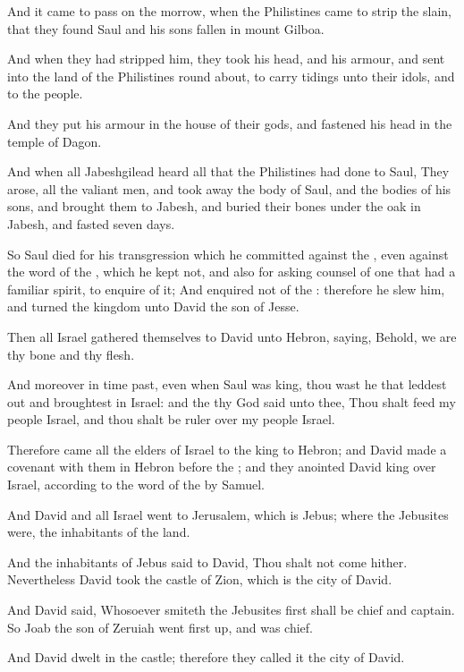 \Verse And it came to pass on the morrow, when the Philistines came to strip the slain, that they found Saul and his sons fallen in mount Gilboa.

\Verse And when they had stripped him, they took his head, and his armour, and sent into the land of the Philistines round about, to carry tidings unto their idols, and to the people.

\Verse And they put his armour in the house of their gods, and fastened his head in the temple of Dagon.

\Verse And when all Jabeshgilead heard all that the Philistines had done to Saul, \Verse They arose, all the valiant men, and took away the body of Saul, and the bodies of his sons, and brought them to Jabesh, and buried their bones under the oak in Jabesh, and fasted seven days.

\Verse So Saul died for his transgression which he committed against the \LORD, even against the word of the \LORD, which he kept not, and also for asking counsel of one that had a familiar spirit, to enquire of it; \Verse And enquired not of the \LORD: therefore he slew him, and turned the kingdom unto David the son of Jesse.


\Chapter
\Verse Then all Israel gathered themselves to David unto Hebron, saying, Behold, we are thy bone and thy flesh.

\Verse And moreover in time past, even when Saul was king, thou wast he that leddest out and broughtest in Israel: and the \LORD thy God said unto thee, Thou shalt feed my people Israel, and thou shalt be ruler over my people Israel.

\Verse Therefore came all the elders of Israel to the king to Hebron; and David made a covenant with them in Hebron before the \LORD; and they anointed David king over Israel, according to the word of the \LORD by Samuel.

\Verse And David and all Israel went to Jerusalem, which is Jebus; where the Jebusites were, the inhabitants of the land.

\Verse And the inhabitants of Jebus said to David, Thou shalt not come hither. Nevertheless David took the castle of Zion, which is the city of David.

\Verse And David said, Whosoever smiteth the Jebusites first shall be chief and captain. So Joab the son of Zeruiah went first up, and was chief.

\Verse And David dwelt in the castle; therefore they called it the city of David.

